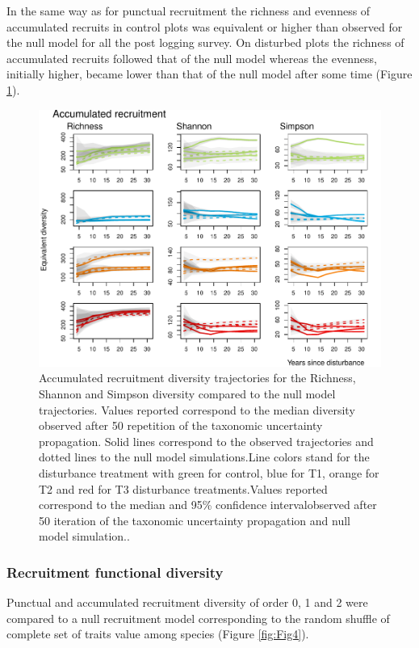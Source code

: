 \documentclass[fleqn,10pt]{ArtEcoFoG} %
\begin{document}
In the same way as for punctual recruitment the richness and evenness of
accumulated recruits in control plots was equivalent or higher than
observed for the null model for all the post logging survey. On
disturbed plots the richness of accumulated recruits followed that of
the null model whereas the evenness, initially higher, became lower than
that of the null model after some time (Figure \ref{fig:Fig3}).

\begin{figure}

{\centering \includegraphics[width=0.8\linewidth]{RecruitmentTrajectories_files/figure-latex/Fig3-1} 

}

\caption{Accumulated recruitment diversity trajectories for the Richness, Shannon and Simpson diversity compared to the null model trajectories. Values reported correspond to the median diversity observed after 50 repetition of the taxonomic uncertainty propagation. Solid lines correspond to the observed trajectories and dotted lines to the null model simulations.Line colors stand for the disturbance treatment with green for control, blue for T1, orange for T2 and red for T3 disturbance treatments.Values reported correspond to the median and 95\% confidence intervalobserved after 50 iteration of the taxonomic uncertainty propagation and null model simulation..}\label{fig:Fig3}
\end{figure}

\subsubsection{Recruitment functional
diversity}\label{recruitment-functional-diversity}

Punctual and accumulated recruitment diversity of order 0, 1 and 2 were
compared to a null recruitment model corresponding to the random shuffle
of complete set of traits value among species (Figure \ref{fig:Fig4}).
\end{document}
